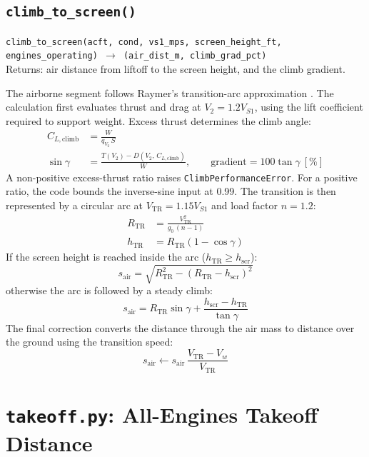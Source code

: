 \documentclass[11pt,letterpaper]{article}
\numberwithin{equation}{section}
\newcommand{\func}[2]{\begin{funcbox}\texttt{#1}\\[2pt]{\color{ink3}Returns:} #2\end{funcbox}}
\newcommand{\code}[1]{\textmd{\texttt{#1}}}
\begin{document}
\subsection{\code{climb\_to\_screen()}}
\func{climb\_to\_screen(acft, cond, vs1\_mps, screen\_height\_ft, engines\_operating) $\rightarrow$ (air\_dist\_m, climb\_grad\_pct)}{air distance from liftoff to the screen height, and the climb gradient.}
The airborne segment follows Raymer's transition-arc approximation \cite[Ch.~17]{RAYMER}. The calculation first evaluates thrust and drag at $V_2=1.2V_{S1}$, using the lift coefficient required to support weight. Excess thrust determines the climb angle:
\begin{align}
C_{L,\text{climb}} &= \frac{W}{q_{V_2}\,S} \label{eq:cl-climb}\\
\sin\gamma &= \frac{T(V_2) - D(V_2,\,C_{L,\text{climb}})}{W}, \qquad \text{gradient} = 100\tan\gamma\ [\%] \label{eq:sin-gamma}
\end{align}
A non-positive excess-thrust ratio raises \code{ClimbPerformanceError}. For a positive ratio, the code bounds the inverse-sine input at 0.99. The transition is then represented by a circular arc at $V_\text{TR}=1.15V_{S1}$ and load factor $n=1.2$:
\begin{align}
R_\text{TR} &= \frac{V_\text{TR}^2}{g_0\,(n-1)} \label{eq:R-tr}\\
h_\text{TR} &= R_\text{TR}\left(1 - \cos\gamma\right) \label{eq:h-tr}
\end{align}
If the screen height is reached inside the arc ($h_\text{TR} \ge h_\text{scr}$):
\begin{equation}
s_\text{air} = \sqrt{R_\text{TR}^2 - \left(R_\text{TR} - h_\text{scr}\right)^2} \label{eq:s-air-arc}
\end{equation}
otherwise the arc is followed by a steady climb:
\begin{equation}
s_\text{air} = R_\text{TR}\sin\gamma + \frac{h_\text{scr} - h_\text{TR}}{\tan\gamma} \label{eq:s-air-climb}
\end{equation}
The final correction converts the distance through the air mass to distance over the ground using the transition speed:
\begin{equation}
s_\text{air} \leftarrow s_\text{air}\,\frac{V_\text{TR} - V_w}{V_\text{TR}} \label{eq:s-air-wind}
\end{equation}

\section{\code{takeoff.py}: All-Engines Takeoff Distance}\label{sec:takeoff}
\end{document}
